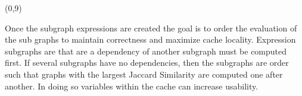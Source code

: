 \documentclass[landscape]{a0poster}
\def\Subhead#1{\noindent{\textbf{\Large\color{DarkBlue} #1}}\medskip}
\begin{document}
\begin{textblock}{30}
\begin{textblock}{14}
\end{textblock}

\begin{textblock}{14}(0,9)
	\Subhead{Rebuilding}%

	\vspace{-0.25in}
	Once the subgraph expressions are created the goal is to order the evaluation of the sub graphs to maintain correctness and maximize cache locality. Expression subgraphs are that are a dependency of another subgraph must be computed first. If several subgraphs have no dependencies, then the subgraphs are order such that graphs with the largest Jaccard Similarity are computed one after another. In doing so variables within the cache can increase usability. 
\end{textblock}

\end{textblock}
\end{document}
